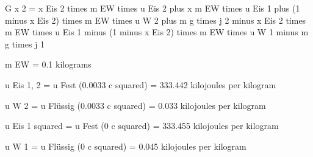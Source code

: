 G x 2 = x Eis 2 times m EW times u Eis 2 plus x m EW times u Eis 1 plus (1 minus x Eis 2) times m EW times u W 2 plus m g times j 2 minus x Eis 2 times m EW times u Eis 1 minus (1 minus x Eis 2) times m EW times u W 1 minus m g times j 1

m EW = 0.1 kilograms

u Eis 1, 2 = u Fest (0.0033 c squared) = 333.442 kilojoules per kilogram

u W 2 = u Flüssig (0.0033 c squared) = 0.033 kilojoules per kilogram

u Eis 1 squared = u Fest (0 c squared) = 333.455 kilojoules per kilogram

u W 1 = u Flüssig (0 c squared) = 0.045 kilojoules per kilogram
